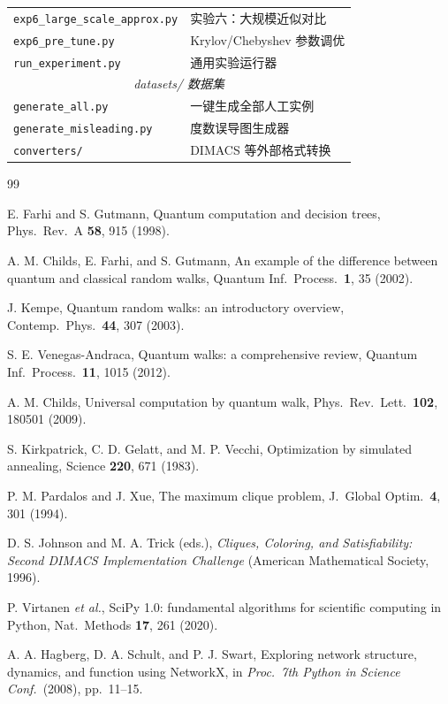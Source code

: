 \documentclass[pre,twocolumn]{revtex4-2}
\begin{document}
\begin{table}[H]
\begin{tabular}{lp{4.2cm}}
\texttt{exp6\_large\_scale\_approx.py} & 实验六：大规模近似对比 \\
\texttt{exp6\_pre\_tune.py}            & Krylov/Chebyshev 参数调优 \\
\texttt{run\_experiment.py}           & 通用实验运行器 \\
\hline
\multicolumn{2}{c}{\textit{datasets/ 数据集}} \\
\hline
\texttt{generate\_all.py}     & 一键生成全部人工实例 \\
\texttt{generate\_misleading.py} & 度数误导图生成器 \\
\texttt{converters/}         & DIMACS 等外部格式转换 \\
\hline\hline
\end{tabular}
\end{table}

\begin{thebibliography}{99}

E. Farhi and S. Gutmann, Quantum computation and decision trees, Phys.\ Rev.\ A \textbf{58}, 915 (1998).

A. M. Childs, E. Farhi, and S. Gutmann, An example of the difference between quantum and classical random walks, Quantum Inf.\ Process.\ \textbf{1}, 35 (2002).

J. Kempe, Quantum random walks: an introductory overview, Contemp.\ Phys.\ \textbf{44}, 307 (2003).

S. E. Venegas-Andraca, Quantum walks: a comprehensive review, Quantum Inf.\ Process.\ \textbf{11}, 1015 (2012).

A. M. Childs, Universal computation by quantum walk, Phys.\ Rev.\ Lett.\ \textbf{102}, 180501 (2009).

S. Kirkpatrick, C. D. Gelatt, and M. P. Vecchi, Optimization by simulated annealing, Science \textbf{220}, 671 (1983).

P. M. Pardalos and J. Xue, The maximum clique problem, J.\ Global Optim.\ \textbf{4}, 301 (1994).

D. S. Johnson and M. A. Trick (eds.), \textit{Cliques, Coloring, and Satisfiability: Second DIMACS Implementation Challenge} (American Mathematical Society, 1996).

P. Virtanen \textit{et al.}, SciPy 1.0: fundamental algorithms for scientific computing in Python, Nat.\ Methods \textbf{17}, 261 (2020).

A. A. Hagberg, D. A. Schult, and P. J. Swart, Exploring network structure, dynamics, and function using NetworkX, in \textit{Proc.\ 7th Python in Science Conf.}\ (2008), pp.\ 11--15.

\end{thebibliography}
\end{document}
